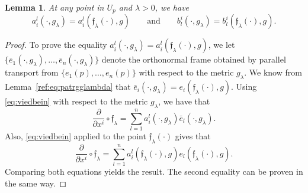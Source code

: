 \documentclass[pdftex]{sigma}
\numberwithin{equation}{section}
\newtheorem{lem}[thm]{Lemma}
\theoremstyle{definition}
\begin{document}
 \begin{lem}\label{lem:vielbeincomp} At any point in $U_p$ and $\lambda>0$, we have
\[a_{i}^{l}(\cdot,g_\lambda)=a_{i}^{l}(\mathfrak{f}_\lambda(\cdot),g) \qquad\text{and}\qquad b_{l}^{i}(\cdot,g_\lambda)=b_{l}^{i}( {\mathfrak f}_\lambda(\cdot),g).\]
 \end{lem}

\begin{proof}
To prove the equality $a_{i}^{l}(\cdot,g_\lambda)=a_{i}^{l}(\mathfrak{f}_\lambda(\cdot),g)$, we let $\{{\bar e}_1(\cdot,g_\lambda),\dots, {\bar e}_n(\cdot,g_\lambda)\}$ denote the orthonormal frame obtained by parallel transport from $\{e_1(p),\dots,e_n(p)\}$ with respect to the metric $g_\lambda$. We know from Lemma~\ref{ref:eq:patrgglambda} that ${\bar e}_i(\cdot,g_\lambda)=e_i(\mathfrak{f}_\lambda(\cdot),g)$. Using \eqref{eq:viedbein} with respect to the metric $g_\lambda$, we have that
\[\frac{\partial}{\partial x^i}\circ \mathfrak{f}_\lambda=\sum_{l=1}^n a_i^l(\cdot,g_\lambda) \bar{e}_l(\cdot,g_\lambda).\]
Also, \eqref{eq:viedbein} applied to the point $\mathfrak{f}_\lambda(\cdot)$ gives that
\[\frac{\partial}{\partial x^i}\circ \mathfrak{f}_\lambda=\sum_{l=1}^n a_i^l(\mathfrak{f}_\lambda(\cdot),g) e_l(\mathfrak{f}_\lambda(\cdot),g).\]
Comparing both equations yields the result. The second equality can be proven in the same way.
\end{proof}
\end{document}
